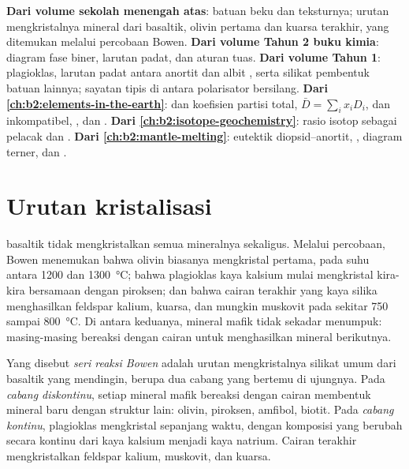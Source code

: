 \begin{recall}
\textbf{Dari volume sekolah menengah atas}: batuan beku dan teksturnya; urutan
mengkristalnya mineral dari  basaltik, olivin pertama dan kuarsa terakhir,
yang ditemukan melalui percobaan Bowen. \textbf{Dari volume Tahun 2 buku kimia}:
diagram fase biner, larutan padat, dan aturan tuas. \textbf{Dari volume Tahun
1}: plagioklas, larutan padat antara anortit  dan albit
, serta silikat pembentuk batuan lainnya; sayatan tipis di antara polarisator
bersilang. \textbf{Dari \cref{ch:b2:elements-in-the-earth}}:  dan
koefisien partisi total, $\bar D = \sum_i x_i D_i$,  dan inkompatibel,
, dan . \textbf{Dari
\cref{ch:b2:isotope-geochemistry}}: rasio isotop sebagai pelacak dan . \textbf{Dari \cref{ch:b2:mantle-melting}}: eutektik diopsid--anortit,
, diagram terner, dan .
\end{recall}

\section{Urutan kristalisasi}\label{sec:b2:magmatic-differentiation:sequences}

 basaltik tidak mengkristalkan semua mineralnya sekaligus. Melalui percobaan, Bowen menemukan
bahwa olivin biasanya mengkristal pertama, pada suhu antara 1200 dan
\qty{1300}{\celsius}; bahwa plagioklas kaya kalsium mulai mengkristal kira-kira bersamaan dengan
piroksen; dan bahwa cairan terakhir yang kaya silika menghasilkan feldspar kalium, kuarsa, dan
mungkin muskovit pada sekitar 750 sampai \qty{800}{\celsius}. Di antara keduanya, mineral
mafik tidak sekadar menumpuk: masing-masing bereaksi dengan cairan untuk menghasilkan mineral berikutnya.

\begin{definition}\label{def:b2:magmatic-differentiation:bowen}
Yang disebut \emph{seri reaksi Bowen} adalah urutan
mengkristalnya silikat umum dari  basaltik yang mendingin, berupa dua cabang
yang bertemu di ujungnya. Pada \emph{cabang diskontinu}, setiap mineral mafik
bereaksi dengan cairan membentuk mineral baru dengan struktur lain: olivin,
piroksen, amfibol, biotit. Pada \emph{cabang kontinu}, plagioklas
mengkristal sepanjang waktu, dengan komposisi yang berubah secara kontinu dari kaya kalsium
menjadi kaya natrium. Cairan terakhir mengkristalkan feldspar kalium, muskovit, dan
kuarsa.
\end{definition}

